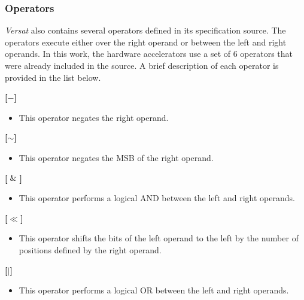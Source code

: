\documentclass{article}
\begin{document}
\vspace{0.5cm}

\subsubsection{Operators}
\textit{Versat} also contains several operators defined in its specification source. The operators execute either over the right operand or between the left and right operands.
In this work, the hardware accelerators use a set of 6 operators that were already included in the source.
A brief description of each operator is provided in the list below.

\vspace{0.5cm}

\textbf{[$-$]}
\begin{itemize}
\item  This operator negates the right operand.
\end{itemize}

\vspace{0.5cm}

\textbf{[$\sim$]}
\begin{itemize}
\item  This operator negates the MSB of the right operand.
\end{itemize}

\vspace{0.5cm}

\textbf{[$\And$]}
\begin{itemize}
\item  This operator performs a logical AND between the left and right operands.
\end{itemize}

\vspace{0.5cm}

\textbf{[$\ll$]}
\begin{itemize}
\item  This operator shifts the bits of the left operand to the left by the number of positions defined by the right operand.
\end{itemize}

\vspace{0.5cm}

\textbf{[$\vert$]}
\begin{itemize}
\item This operator performs a logical OR between the left and right operands.
\end{itemize}

\vspace{0.5cm}
\end{document}
